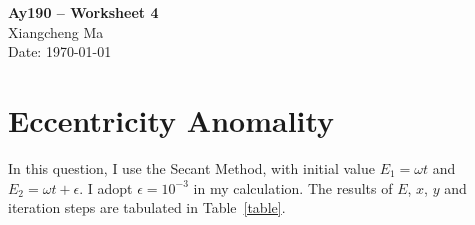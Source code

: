 \documentclass[11pt,letterpaper]{article}
\begin{document}
\begin{center}
\Large
{\bf Ay190 -- Worksheet 4} \\
\large
Xiangcheng Ma \\
Date: \today
\end{center}

\section*{Eccentricity Anomality}
In this question, I use the Secant Method, with initial value $E_1=\omega t$ and $E_2=\omega t + \epsilon$. I adopt $\epsilon=10^{-3}$ in my calculation. The results of $E$, $x$, $y$ and iteration steps are tabulated in Table~\ref{table}.

\end{document}
